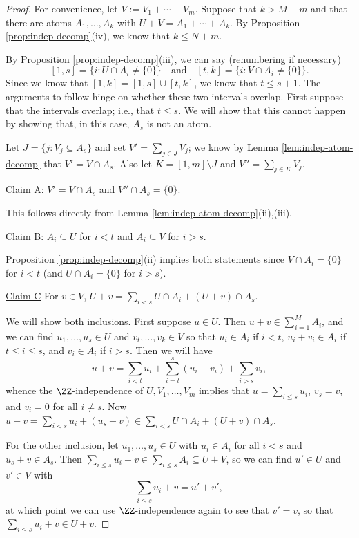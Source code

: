 \begin{proof}
For convenience, let $V := V_1 + \cdots + V_m$.
Suppose that $k > M + m$ and that there are atoms $A_1,\dots,A_k$ with $U+V = A_1 + \cdots + A_k$.
By Proposition \ref{prop:indep-decomp}(iv), we know that $k \le N+m$.
	
By Proposition \ref{prop:indep-decomp}(iii), we can say (renumbering if necessary)
\[ [ 1,s ] =  \{ i: U\cap A_i \neq\{0\}\} \quad \textrm{and} \quad [ t,k ] = \{i: V\cap A_i \neq \{0\}\}. \]
Since we know that $[ 1,k ] = [ 1,s ] \cup [ t,k ]$, we know that $t \le s+1$.
The arguments to follow hinge on whether these two intervals overlap.  
First suppose that the intervals overlap; i.e., that $t \le s$.
We will show that this cannot happen by showing that, in this case, $A_s$ is not an atom.
	
Let $J = \{ j: V_j \subseteq A_s \}$ and set $V' = \sum_{j\in J} V_j$; we know by Lemma \ref{lem:indep-atom-decomp} that $V' = V \cap A_s$.
Also let $K = [ 1,m ] \setminus J$ and $V'' = \sum_{j\in K} V_j$.
	
\noindent\underline{Claim A}: $V' = V\cap A_s$ and $V'' \cap A_s = \{0\}$. \label{cla}
	
This follows directly from Lemma \ref{lem:indep-atom-decomp}(ii),(iii).
	
\noindent\underline{Claim B}: $A_i \subseteq U$ for $i<t$ and $A_i \subseteq V$ for $i > s$. \label{clb}
	
Proposition \ref{prop:indep-decomp}(ii) implies both statements since $V \cap A_i = \{0\}$ for $i<t$ (and $U\cap A_i = \{0\}$ for $i>s$).
	
\noindent\underline{Claim C} For $v\in V$, $U+v = \sum\limits_{i<s} U\cap A_i + (U+v)\cap A_s$. \label{clc}
	
We will show both inclusions.
First suppose $u\in U$. 
Then $u+v \in \sum_{i=1}^M A_i$, and we can find $u_1,\dots, u_s\in U$ and $v_t,\dots, v_k\in V$ so that
$u_i\in A_i$ if $i < t$, $u_i + v_i \in A_i$ if $t\le i \le s$, and $v_i \in A_i$ if $i > s$.
Then we will have
\[u+v = \sum_{i<t} u_i + \sum_{i=t}^{s} (u_i+v_i) + \sum_{i > s} v_i, \]
whence the $\ZZ$-independence of $U,V_1,\dots,V_m$ implies that $u = \sum_{i\le s} u_i$, $v_s = v$, and $v_i = 0$ for all $i\neq s$.
Now $u+v = \sum_{i<s} u_i + (u_s+v)\in \sum_{i<s} U\cap A_i + (U+v)\cap A_s$.
	
For the other inclusion, let $u_1,\dots, u_s\in U$ with $u_i\in A_i$ for all $i<s$ and $u_s + v\in A_s$.
Then $\sum_{i\le s} u_i +v \in \sum_{i\le s} A_i \subseteq U+V$, so we can find $u'\in U$ and $v'\in V$ with 
\[\sum_{i\le s}u_i + v = u' + v',\]
at which point we can use $\ZZ$-independence again to see that $v' = v$, so that $\sum_{i\le s} u_i + v\in U+v$.
	

\end{proof}
